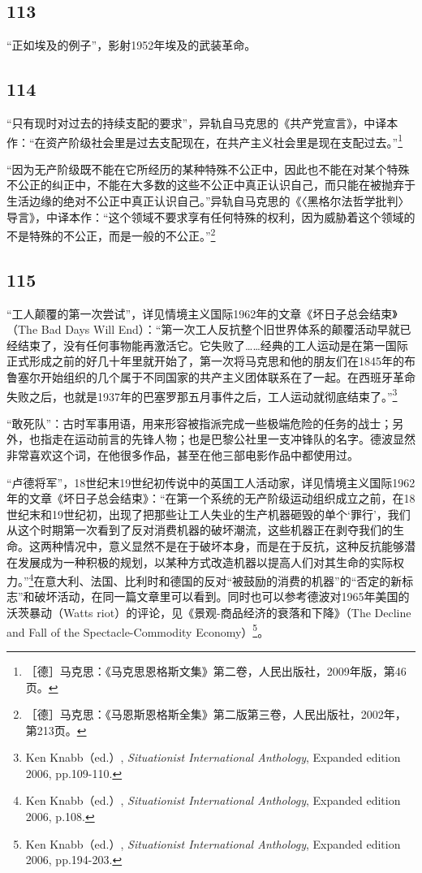 \documentclass[fontset=fandol, a4paper, 12pt, openright]{ctexbook}
\begin{document}
\subsection*{113}
“正如埃及的例子”，影射1952年埃及的武装革命。

\subsection*{114}
“只有现时对过去的持续支配的要求”，异轨自马克思的《共产党宣言》，中译本作：“在资产阶级社会里是过去支配现在，在共产主义社会里是现在支配过去。”\footnote{［德］马克思：《马克思恩格斯文集》第二卷，人民出版社，2009年版，第46页。}

“因为无产阶级既不能在它所经历的某种特殊不公正中，因此也不能在对某个特殊不公正的纠正中，不能在大多数的这些不公正中真正认识自己，而只能在被抛弃于生活边缘的绝对不公正中真正认识自己。”异轨自马克思的《〈黑格尔法哲学批判〉导言》，中译本作：“这个领域不要求享有任何特殊的权利，因为威胁着这个领域的不是特殊的不公正，而是一般的不公正。”\footnote{［德］马克思：《马恩斯恩格斯全集》第二版第三卷，人民出版社，2002年，第213页。}

\subsection*{115}
“工人颠覆的第一次尝试”，详见情境主义国际1962年的文章《坏日子总会结束》（The Bad Days Will End）：“第一次工人反抗整个旧世界体系的颠覆活动早就已经结束了，没有任何事物能再激活它。它失败了……经典的工人运动是在第一国际正式形成之前的好几十年里就开始了，第一次将马克思和他的朋友们在1845年的布鲁塞尔开始组织的几个属于不同国家的共产主义团体联系在了一起。在西班牙革命失败之后，也就是1937年的巴塞罗那五月事件之后，工人运动就彻底结束了。”\footnote{Ken Knabb（ed.）, \textit{Situationist International Anthology}, Expanded edition 2006, pp.109-110.}

“敢死队”：古时军事用语，用来形容被指派完成一些极端危险的任务的战士；另外，也指走在运动前言的先锋人物；也是巴黎公社里一支冲锋队的名字。德波显然非常喜欢这个词，在他很多作品，甚至在他三部电影作品中都使用过。

“卢德将军”，18世纪末19世纪初传说中的英国工人活动家，详见情境主义国际1962年的文章《坏日子总会结束》：“在第一个系统的无产阶级运动组织成立之前，在18世纪末和19世纪初，出现了把那些让工人失业的生产机器砸毁的单个‘罪行’，我们从这个时期第一次看到了反对消费机器的破坏潮流，这些机器正在剥夺我们的生命。这两种情况中，意义显然不是在于破坏本身，而是在于反抗，这种反抗能够潜在发展成为一种积极的规划，以某种方式改造机器以提高人们对其生命的实际权力。”\footnote{Ken Knabb（ed.）, \textit{Situationist International Anthology}, Expanded edition 2006, p.108.}在意大利、法国、比利时和德国的反对“被鼓励的消费的机器”的“否定的新标志”和破坏活动，在同一篇文章里可以看到。同时也可以参考德波对1965年美国的沃茨暴动（Watts riot）的评论，见《景观-商品经济的衰落和下降》（The Decline and Fall of the Spectacle-Commodity Economy）\footnote{Ken Knabb（ed.）, \textit{Situationist International Anthology}, Expanded edition 2006, pp.194-203.}。
\end{document}

